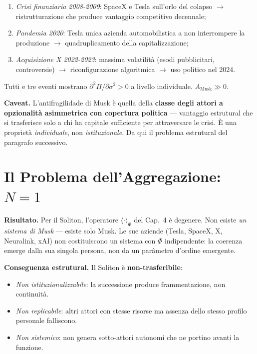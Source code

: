 \begin{enumerate}
\def\labelenumi{\arabic{enumi}.}
\tightlist
\item
  \emph{Crisi finanziaria 2008-2009}: SpaceX e Tesla sull'orlo del
  colapso $\to$ ristrutturazione che produce vantaggio competitivo
  decennale;
\item
  \emph{Pandemia 2020}: Tesla unica azienda automobilistica a non
  interrompere la produzione $\to$ quadruplicamento della capitalizzazione;
\item
  \emph{Acquisizione X 2022-2023}: massima volatilità (esodi
  pubblicitari, controversie) $\to$ riconfigurazione algoritmica $\to$ uso
  politico nel 2024.
\end{enumerate}

\Proved{} Tutti e tre eventi mostrano
\(\partial^2 \Pi / \partial \sigma^2 > 0\) a livello individuale.
\(A_{\text{Musk}} \gg 0\).

\Conj{} \textbf{Caveat.} L'antifragilidade di Musk è quella della
\textbf{classe degli attori a opzionalità asimmetrica con copertura
politica} --- vantaggio estrutural che si trasferisce solo a chi ha
capitale sufficiente per attraversare le crisi. È una proprietà
\emph{individuale}, non \emph{istituzionale}. Da qui il problema
estrutural del paragrafo successivo.



\section{\texorpdfstring{Il Problema dell'Aggregazione:
\(N = 1\)}{Il Problema dell'Aggregazione: N = 1}}\label{il-problema-dellaggregazione-n-1}

\Proved{} \textbf{Risultato.} Per il Soliton, l'operatore
\(\langle\cdot\rangle_\Phi\) del Cap.~4 è degenere. Non esiste \emph{un
sistema di Musk} --- esiste solo Musk. Le sue aziende (Tesla, SpaceX, X,
Neuralink, xAI) non costituiscono un sistema con \(\Phi\) indipendente:
la coerenza emerge dalla sua singola persona, non da un parâmetro
d'ordine emergente.

\Hypoth{} \textbf{Conseguenza estrutural.} Il Soliton è
\textbf{non-trasferibile}:

\begin{itemize}
\tightlist
\item
  \emph{Non istituzionalizzabile}: la successione produce
  frammentazione, non continuità.
\item
  \emph{Non replicabile}: altri attori con stesse risorse ma assenza
  dello stesso profilo personale falliscono.
\item
  \emph{Non sistemico}: non genera sotto-attori autonomi che ne portino
  avanti la funzione.
\end{itemize}

